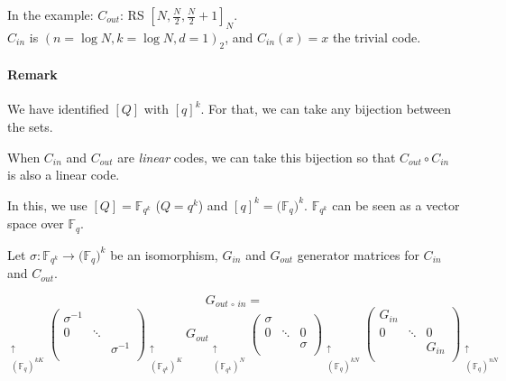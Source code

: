 \documentclass{article}
\begin{document}
In the example: $C_{out}$: RS $\left[ N, \frac{N}{2}, \frac{N}{2}+1\right]_N$.\\
$C_{in}$ is $(n=\log N, k= \log N, d=1)_2$, and $C_{in}(x)=x$ the trivial code.

\paragraph{Remark}
We have identified $[Q]$ with $[q]^k$. For that, we can take any bijection between the sets.

When $C_{in}$ and $C_{out}$ are \emph{linear} codes, we can take this bijection so that $C_{out}\circ C_{in}$ is also a linear code.

In this, we use $[Q]=\mathbb{F}_{q^k}$ ($Q=q^k$) and $[q]^k=\big( \mathbb{F}_q\big) ^k$. $\mathbb{F}_{q^k}$ can be seen as a vector space over $\mathbb{F}_q$.

Let $\sigma : \mathbb{F}_{q^k}\to \big( \mathbb{F}_q \big)^k$ be an isomorphism, $G_{in}$ and $G_{out}$ generator matrices for $C_{in}$ and $C_{out}$.


\[G_{out \,\circ\, in} =\]
\[
\underset{\substack{\\\uparrow \\ (\mathbb{F}_q)^{kK}}}{}
\begin{pmatrix}
\sigma^{-1} & \\
0 & \ddots & \\
& & \sigma^{-1} \\
\end{pmatrix}
\underset{\substack{\\\uparrow \\ (\mathbb{F}_{q^k})^{K}}}{}
G_{out}
\underset{\substack{\\\uparrow \\ (\mathbb{F}_{q^k})^{N}}}{}
\begin{pmatrix}
\sigma & \\
0& \ddots &0 \\
& & \sigma \\
\end{pmatrix}
\underset{\substack{\\\uparrow \\ (\mathbb{F}_q)^{kN}}}{}
\begin{pmatrix}
G_{in} & & \\
0 & \ddots & 0 \\
&  & G_{in} \\
\end{pmatrix}
\underset{\substack{\\\uparrow \\ (\mathbb{F}_q)^{nN}}}{}
\]
\end{document}

